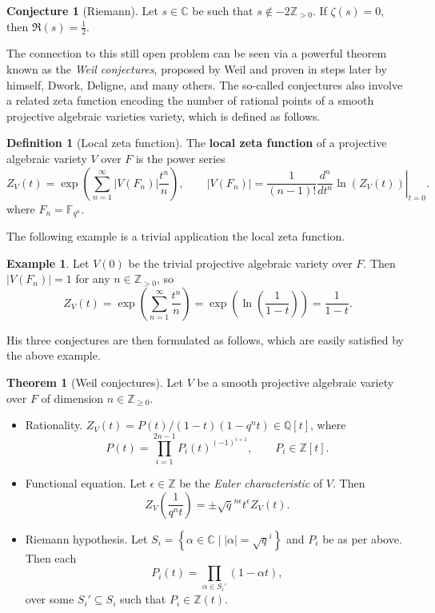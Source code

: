 \documentclass{article}
\newcommand{\F}{\mathbb{F}}
\newcommand{\Z}{\mathbb{Z}}
\newcommand{\Q}{\mathbb{Q}}
\newcommand{\C}{\mathbb{C}}
\newcommand{\val}[1]{\left. #1 \right\rvert}
\newcommand{\rb}[1]{\left( #1 \right)}
\renewcommand{\sb}[1]{\left[ #1 \right]}
\newcommand{\cb}[1]{\left\{ #1 \right\}}
\newcommand{\abs}[1]{\left\lvert #1 \right\rvert}
\theoremstyle{definition}\newtheorem*{definition}{Definition}
\theoremstyle{definition}\newtheorem*{example}{Example}
\theoremstyle{definition}\newtheorem*{remark}{Remark}
\newtheorem{theorem}[proposition]{Theorem}
\newtheorem{conjecture}[proposition]{Conjecture}
\begin{document}
\begin{conjecture}[Riemann]
Let $ s \in \C $ be such that $ s \notin -2\Z_{> 0} $. If $ \zeta\rb{s} = 0 $, then $ \Re\rb{s} = \tfrac{1}{2} $.
\end{conjecture}

The connection to this still open problem can be seen via a powerful theorem known as the \emph{Weil conjectures}, proposed by Weil and proven in steps later by himself, Dwork, Deligne, and many others. The so-called conjectures also involve a related zeta function encoding the number of rational points of a smooth projective algebraic varieties variety, which is defined as follows.

\begin{definition}[Local zeta function]
The \textbf{local zeta function} of a projective algebraic variety $ V $ over $ F $ is the power series
$$ Z_V\rb{t} = \exp\rb{\sum_{n = 1}^\infty \abs{V\rb{F_n}}\dfrac{t^n}{n}}, \qquad \abs{V\rb{F_n}} = \dfrac{1}{\rb{n - 1}!}\val{\dfrac{d^n}{dt^n}\ln\rb{Z_V\rb{t}}}_{t = 0}. $$
where $ F_n = \F_{q^n} $.
\end{definition}

The following example is a trivial application the local zeta function.

\begin{example}
Let $ V\rb{0} $ be the trivial projective algebraic variety over $ F $. Then $ \abs{V\rb{F_n}} = 1 $ for any $ n \in \Z_{> 0} $, so
$$ Z_V\rb{t} = \exp\rb{\sum_{n = 1}^\infty \dfrac{t^n}{n}} = \exp\rb{\ln\rb{\dfrac{1}{1 - t}}} = \dfrac{1}{1 - t}. $$
\end{example}

His three conjectures are then formulated as follows, which are easily satisfied by the above example.

\begin{theorem}[Weil conjectures]
\label{thm:weil}
Let $ V $ be a smooth projective algebraic variety over $ F $ of dimension $ n \in \Z_{\ge 0} $.
\begin{itemize}
\item Rationality. $ Z_V\rb{t} = P\rb{t} / \rb{1 - t}\rb{1 - q^nt} \in \Q\sb{t} $, where
$$ P\rb{t} = \prod_{i = 1}^{2n - 1} P_i\rb{t}^{\rb{-1}^{i + 1}}, \qquad P_i \in \Z\sb{t}. $$
\item Functional equation. Let $ \epsilon \in \Z $ be the \emph{Euler characteristic} of $ V $. Then
$$ Z_V\rb{\dfrac{1}{q^nt}} = \pm \sqrt{q}^{n\epsilon} t^\epsilon Z_V\rb{t}. $$
\item Riemann hypothesis. Let $ S_i = \cb{\alpha \in \C \mid \abs{\alpha} = \sqrt{q}^i} $ and $ P_i $ be as per above. Then each
$$ P_i\rb{t} = \prod_{\alpha \in S_i'} \rb{1 - \alpha t}, $$
over some $ S_i' \subseteq S_i $ such that $ P_i \in \Z\rb{t} $.
\end{itemize}
\end{theorem}
\end{document}
